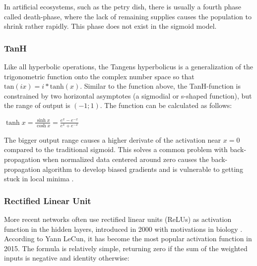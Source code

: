 In artificial ecosystems, such as the petry dish, there is usually a fourth phase called death-phase, where the lack of remaining supplies causes the population to shrink rather rapidly. This phase does not exist in the sigmoid model. 




\subsubsection{TanH}

Like all hyperbolic operations, the Tangens hyperbolicus is a generalization of the trigonometric function onto the complex number space so that $\text{tan}(ix) = i * \text{tanh}(x)$. Similar to the  function above, the TanH-function is constrained by two horizontal asymptotes (a sigmodial or s-shaped function), but the range of output is $(-1; 1)$. The function can be calculated as follows:

{\centering
$\displaystyle \tanh x={\frac {\sinh x}{\cosh x}}={\frac {e^{x}-e^{-x}}{e^{x}+e^{-x}}}$
\par
}

\vspace{20pt}

The bigger output range causes a higher derivate of the activation near  $x=0$ compared to the traditional sigmoid. This solves a common problem with back-propagation when normalized data centered around zero causes the back-propagation algorithm to develop biased gradients and is vulnerable to getting stuck in local minima \cite{LeCun1998}.


\subsubsection{Rectified Linear Unit}

More recent networks often use rectified linear units (ReLUs) as activation function in the hidden layers, introduced in 2000 with motivations in biology \cite{Hahnloser:2000aa}. According to Yann LeCun, it has become the most popular activation function in 2015. The formula is relatively simple, returning zero if the sum of the weighted inputs is negative and identity otherwise: 

